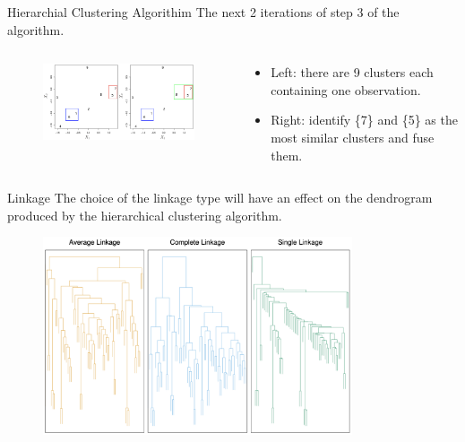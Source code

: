 \documentclass[
  ignorenonframetext,
  aspectratio=169,
]{beamer}
\begin{document}
\begin{frame}{Hierarchial Clustering Algorithim}
\protect\hypertarget{hierarchial-clustering-algorithim-1}{}
The next 2 iterations of step 3 of the algorithm.

\begin{columns}[T]
\begin{column}{0.7\textwidth}
\begin{figure}

{\centering \includegraphics[width=4.27083in,height=\textheight]{images/hierarchical_alg2.png}

}

\end{figure}
\end{column}

\begin{column}{0.3\textwidth}
\begin{itemize}
\item
  Left: there are 9 clusters each containing one observation.
\item
  Right: identify \{7\} and \{5\} as the most similar clusters and fuse
  them.
\end{itemize}
\end{column}
\end{columns}
\end{frame}

\begin{frame}{Linkage}
\protect\hypertarget{linkage-1}{}
The choice of the linkage type will have an effect on the dendrogram
produced by the hierarchical clustering algorithm.

\begin{figure}

{\centering \includegraphics[width=3.59375in,height=\textheight]{images/linkage_choice.png}

}

\end{figure}
\end{frame}
\end{document}
